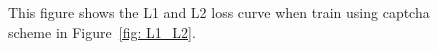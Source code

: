 \begin{figure}
{  }
  \caption{This figure shows the L1 and L2 loss curve when train using captcha scheme in Figure~\ref{fig: L1_L2}.}
  \label{fig: loss_anlysis}
\end{figure}

